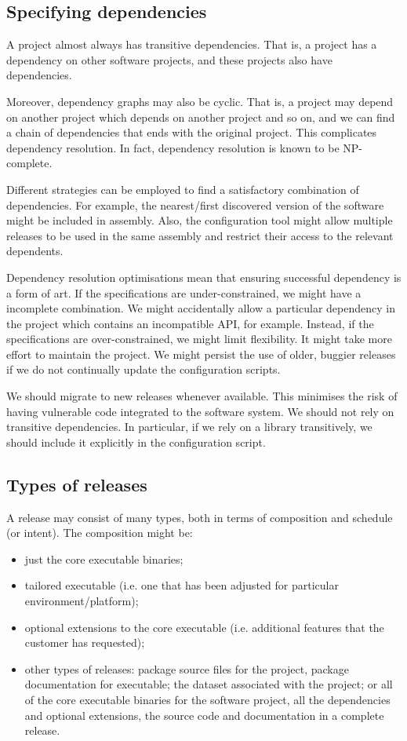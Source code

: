 \documentclass[a4paper, openany]{memoir}
\begin{document}
\subsection{Specifying dependencies}
A project almost always has transitive dependencies. That is, a project has a dependency on other software projects, and these projects also have dependencies. 

Moreover, dependency graphs may also be cyclic. That is, a project may depend on another project which depends on another project and so on, and we can find a chain of dependencies that ends with the original project. This complicates dependency resolution. In fact, dependency resolution is known to be NP-complete.

Different strategies can be employed to find a satisfactory combination of dependencies. For example, the nearest/first discovered version of the software might be included in assembly. Also, the configuration tool might allow multiple releases to be used in the same assembly and restrict their access to the relevant dependents.

Dependency resolution optimisations mean that ensuring successful dependency is a form of art. If the specifications are under-constrained, we might have a incomplete combination. We might accidentally allow a particular dependency in the project which contains an incompatible API, for example. Instead, if the specifications are over-constrained, we might limit flexibility. It might take more effort to maintain the project. We might persist the use of older, buggier releases if we do not continually update the configuration scripts.

We should migrate to new releases whenever available. This minimises the risk of having vulnerable code integrated to the software system. We should not rely on transitive dependencies. In particular, if we rely on a library transitively, we should include it explicitly in the configuration script.

\subsection{Types of releases}
A release may consist of many types, both in terms of composition and schedule (or intent). The composition might be:
\begin{itemize}
    \item just the core executable binaries;
    \item tailored executable (i.e. one that has been adjusted for particular environment/platform);
    \item optional extensions to the core executable (i.e. additional features that the customer has requested);
    \item other types of releases: package source files for the project, package documentation for executable; the dataset associated with the project; or all of the core executable binaries for the software project, all the dependencies and optional extensions, the source code and documentation in a complete release.
\end{itemize}
\end{document}
